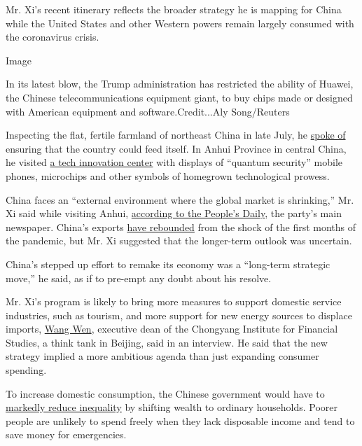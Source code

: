 Mr. Xi's recent itinerary reflects the broader strategy he is mapping
for China while the United States and other Western powers remain
largely consumed with the coronavirus crisis.

Image

In its latest blow, the Trump administration has restricted the ability
of Huawei, the Chinese telecommunications equipment giant, to buy chips
made or designed with American equipment and software.Credit...Aly
Song/Reuters

Inspecting the flat, fertile farmland of northeast China in late July,
he \href{http://jhsjk.people.cn/article/31797420}{spoke of} ensuring
that the country could feed itself. In Anhui Province in central China,
he visited \href{https://www.youtube.com/watch?v=VzwkIJt3jTE\&t=1048s}{a
tech innovation center} with displays of ``quantum security'' mobile
phones, microchips and other symbols of homegrown technological prowess.

China faces an ``external environment where the global market is
shrinking,'' Mr. Xi said while visiting Anhui,
\href{http://politics.people.com.cn/n1/2020/0824/c1001-31833325.html}{according
to the People's Daily}, the party's main newspaper. China's exports
\href{https://www.nytimes3xbfgragh.onion/2020/08/07/business/chinas-exports-rise-despite-the-virus-surprising-economists.html}{have
rebounded} from the shock of the first months of the pandemic, but Mr.
Xi suggested that the longer-term outlook was uncertain.

China's stepped up effort to remake its economy was a ``long-term
strategic move,'' he said, as if to pre-empt any doubt about his
resolve.

Mr. Xi's program is likely to bring more measures to support domestic
service industries, such as tourism, and more support for new energy
sources to displace imports,
\href{http://en.rdcy.org/indexen/index/leader_cont/pid/692/id/14791.html}{Wang
Wen}, executive dean of the Chongyang Institute for Financial Studies, a
think tank in Beijing, said in an interview. He said that the new
strategy implied a more ambitious agenda than just expanding consumer
spending.

To increase domestic consumption, the Chinese government would have to
\href{https://www.nytimes3xbfgragh.onion/2020/08/31/world/europe/thomas-piketty-china.html}{markedly
reduce inequality} by shifting wealth to ordinary households. Poorer
people are unlikely to spend freely when they lack disposable income and
tend to save money for emergencies.

